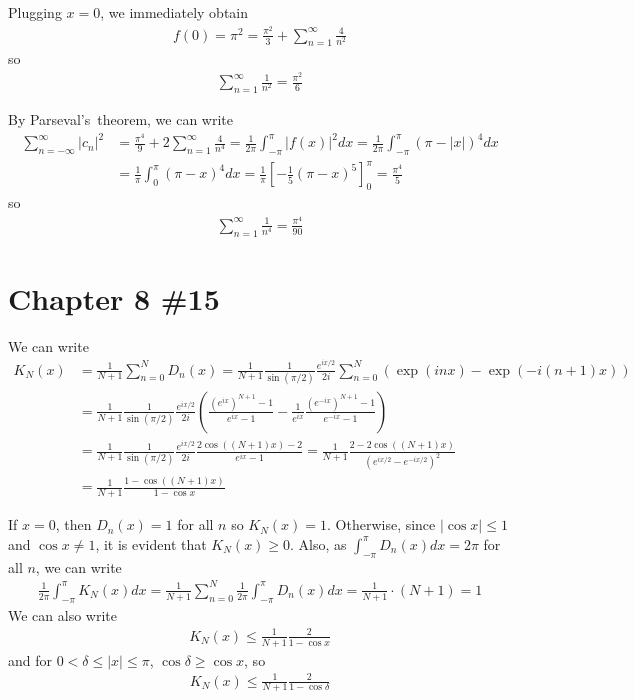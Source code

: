 \documentclass{scrartcl}
\begin{document}
Plugging \(x = 0\), we immediately obtain
\begin{align*}
  f(0)
  = \pi^2
  = \frac{\pi^2}{3} + \sum^\infty_{n = 1} \frac{4}{n^2}
\end{align*}
so
\begin{align*}
  \sum^\infty_{n = 1} \frac{1}{n^2} = \frac{\pi^2}{6}
\end{align*}

By Parseval's~theorem, we can write
\begin{align*}
  \sum^\infty_{n = -\infty} |c_n|^2
  &= \frac{\pi^4}{9} + 2\sum^\infty_{n = 1} \frac{4}{n^4}
  = \frac{1}{2\pi} \int^\pi_{-\pi} |f(x)|^2 dx
  = \frac{1}{2\pi} \int^\pi_{-\pi} (\pi - |x|)^4 dx \\
  &= \frac{1}{\pi} \int^\pi_0 (\pi - x)^4 dx
  = \frac{1}{\pi} \left[ -\frac{1}{5} (\pi - x)^5 \right]^\pi_0
  = \frac{\pi^4}{5}
\end{align*}
so
\begin{align*}
  \sum^\infty_{n = 1} \frac{1}{n^4}
  = \frac{\pi^4}{90}
\end{align*}

\section{Chapter 8 \#15}
We can write
\begin{align*}
  K_N(x)
  &= \frac{1}{N + 1} \sum^N_{n = 0} D_n(x)
  = \frac{1}{N + 1} \frac{1}{\sin (\pi / 2)} \frac{e^{ix / 2}}{2i}
    \sum^N_{n = 0} (\exp (inx) - \exp (-i(n + 1)x)) \\
  &= \frac{1}{N + 1} \frac{1}{\sin (\pi / 2)} \frac{e^{ix / 2}}{2i}
    \left( \frac{(e^{ix})^{N + 1} - 1}{e^{ix} - 1}
      - \frac{1}{e^{ix}} \frac{(e^{-ix})^{N + 1} - 1}{e^{-ix} - 1} \right) \\
  &= \frac{1}{N + 1} \frac{1}{\sin (\pi / 2)} \frac{e^{ix / 2}}{2i}
    \frac{2\cos ((N + 1)x) - 2}{e^{ix} - 1}
  = \frac{1}{N + 1} \frac{2 - 2\cos ((N + 1)x)}{(e^{ix / 2} - e^{-ix / 2})^2}
  \\
  &= \frac{1}{N + 1} \frac{1 - \cos ((N + 1)x)}{1 - \cos x}
\end{align*}

If \(x = 0\), then \(D_n(x) = 1\) for all \(n\) so \(K_N(x) = 1\). Otherwise,
since \(|\cos x| \le 1\) and \(\cos x \not = 1\), it is evident that \(K_N(x)
\ge 0\). Also, as \(\int^\pi_{-\pi} D_n(x) dx = 2\pi\) for all \(n\), we can
write
\begin{align*}
  \frac{1}{2\pi} \int^\pi_{-\pi} K_N(x) dx
  = \frac{1}{N + 1} \sum^N_{n = 0} \frac{1}{2\pi} \int^\pi_{-\pi} D_n(x) dx
  = \frac{1}{N + 1} \cdot (N + 1)
  = 1
\end{align*}
We can also write
\begin{align*}
  K_N(x) \le \frac{1}{N + 1} \frac{2}{1 - \cos x}
\end{align*}
and for \(0 < \delta \le |x| \le \pi\), \(\cos \delta \ge \cos x\), so
\begin{align*}
  K_N(x) \le \frac{1}{N + 1} \frac{2}{1 - \cos \delta}
\end{align*}
\end{document}
